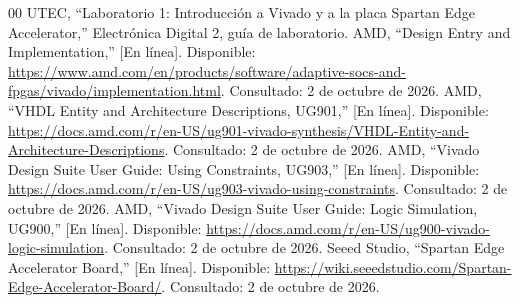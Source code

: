 \documentclass[conference]{IEEEtran}
\begin{document}
\begin{thebibliography}{00}
 UTEC, ``Laboratorio 1: Introducción a Vivado y a la placa
Spartan Edge Accelerator,'' Electrónica Digital 2, guía de laboratorio.
 AMD, ``Design Entry and Implementation,'' [En línea]. Disponible: \url{https://www.amd.com/en/products/software/adaptive-socs-and-fpgas/vivado/implementation.html}. Consultado: 2 de octubre de 2026.
 AMD, ``VHDL Entity and Architecture Descriptions, UG901,'' [En línea]. Disponible: \url{https://docs.amd.com/r/en-US/ug901-vivado-synthesis/VHDL-Entity-and-Architecture-Descriptions}. Consultado: 2 de octubre de 2026.
 AMD, ``Vivado Design Suite User Guide: Using Constraints, UG903,'' [En línea]. Disponible: \url{https://docs.amd.com/r/en-US/ug903-vivado-using-constraints}. Consultado: 2 de octubre de 2026.
 AMD, ``Vivado Design Suite User Guide: Logic Simulation, UG900,'' [En línea]. Disponible: \url{https://docs.amd.com/r/en-US/ug900-vivado-logic-simulation}. Consultado: 2 de octubre de 2026.
 Seeed Studio, ``Spartan Edge Accelerator Board,'' [En línea]. Disponible: \url{https://wiki.seeedstudio.com/Spartan-Edge-Accelerator-Board/}. Consultado: 2 de octubre de 2026.
\end{thebibliography}

\end{document}
